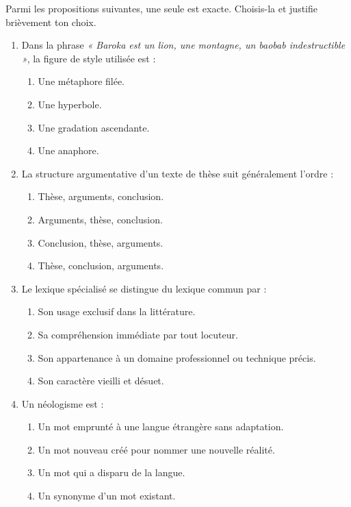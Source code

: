 \documentclass[11pt]{article}
\begin{document}
\begin{exercice}
Parmi les propositions suivantes, une seule est exacte. Choisis-la et justifie brièvement ton choix.
\begin{enumerate}
    \item Dans la phrase \emph{« Baroka est un lion, une montagne, un baobab indestructible »}, la figure de style utilisée est :
    \begin{enumerate}
        \item Une métaphore filée.
        \item Une hyperbole.
        \item Une gradation ascendante.
        \item Une anaphore.
    \end{enumerate}
    \item La structure argumentative d'un texte de thèse suit généralement l'ordre :
    \begin{enumerate}
        \item Thèse, arguments, conclusion.
        \item Arguments, thèse, conclusion.
        \item Conclusion, thèse, arguments.
        \item Thèse, conclusion, arguments.
    \end{enumerate}
    \item Le lexique spécialisé se distingue du lexique commun par :
    \begin{enumerate}
        \item Son usage exclusif dans la littérature.
        \item Sa compréhension immédiate par tout locuteur.
        \item Son appartenance à un domaine professionnel ou technique précis.
        \item Son caractère vieilli et désuet.
    \end{enumerate}
    \item Un néologisme est :
    \begin{enumerate}
        \item Un mot emprunté à une langue étrangère sans adaptation.
        \item Un mot nouveau créé pour nommer une nouvelle réalité.
        \item Un mot qui a disparu de la langue.
        \item Un synonyme d'un mot existant.
    \end{enumerate}
\end{enumerate}
\end{exercice}
\end{document}

